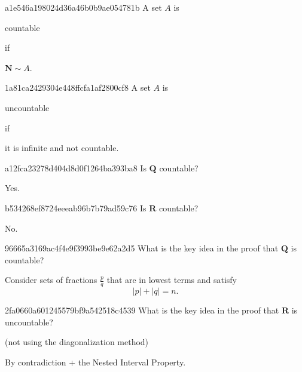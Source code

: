 \begin{note}{a1e546a198024d36a46b0b9ae054781b}
    A set \({ A }\) is \begin{icloze}{2}countable\end{icloze} if \begin{icloze}{1}\({ \mathbf{N} \sim A }\).\end{icloze}
\end{note}

\begin{note}{1a81ca2429304e448ffcfa1af2800cf8}
    A set \({ A }\) is \begin{icloze}{2}uncountable\end{icloze} if \begin{icloze}{1}it is infinite and not countable.\end{icloze}
\end{note}

\begin{note}{a12fca23278d404d8d0f1264ba393ba8}
    Is \({ \mathbf{Q} }\) countable?

    \begin{cloze}{1}
        Yes.
    \end{cloze}
\end{note}

\begin{note}{b534268ef8724eeeab96b7b79ad59c76}
    Is \({ \mathbf{R} }\) countable?

    \begin{cloze}{1}
        No.
    \end{cloze}
\end{note}

\begin{note}{96665a3169ac4f4e9f3993be9e62a2d5}
    What is the key idea in the proof that \({ \mathbf{Q} }\) is countable?

    \begin{cloze}{1}
        Consider sets of fractions \({ \frac{p}{q} }\) that are in lowest terms and satisfy
        \[
            \left\lvert p \right\rvert + \left\lvert q \right\rvert = n.
        \]
    \end{cloze}
\end{note}

\begin{note}{2fa0660a601245579bf9a542518c4539}
    What is the key idea in the proof that \({ \mathbf{R} }\) is uncountable?

    \begin{center}
        \tiny
        (not using the diagonalization method)
    \end{center}

    \begin{cloze}{1}
        By contradiction + the Nested Interval Property.
    \end{cloze}
\end{note}


